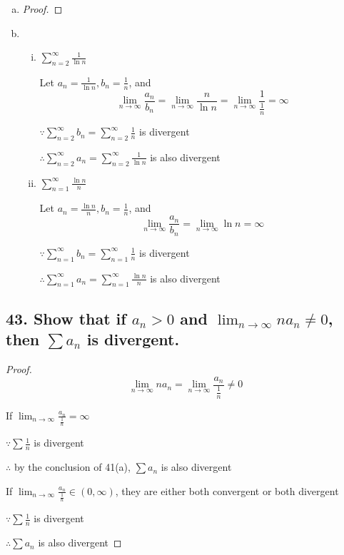 \documentclass{article}
\begin{document}
    \begin{enumerate}[(a)]
        \item \begin{proof}
            
        \end{proof}

        \item
        \begin{enumerate}[(i)]
            \item $\sum_{n=2}^\infty \frac{1}{\ln n}$

            Let $a_n = \frac{1}{\ln n}, b_n = \frac{1}{n}$, and $$\lim_{n\to\infty}\frac{a_n}{b_n} = \lim_{n\to\infty}\frac{n}{\ln n} = \lim_{n\to\infty}\frac{1}{\frac 1 n } = \infty$$

            $\because \sum_{n=2}^\infty b_n = \sum_{n=2}^\infty \frac 1 n$ is divergent

            $\therefore \sum_{n=2}^\infty a_n = \sum_{n=2}^\infty \frac{1}{\ln n}$ is also divergent

            \item $\sum_{n=1}^\infty \frac{\ln n}{n}$


            Let $a_n = \frac{\ln n}{n}, b_n = \frac{1}{n}$, and $$\lim_{n\to\infty}\frac{a_n}{b_n} = \lim_{n\to\infty}\ln n = \infty$$

            $\because \sum_{n=1}^\infty b_n = \sum_{n=1}^\infty \frac 1 n$ is divergent

            $\therefore \sum_{n=1}^\infty a_n = \sum_{n=1}^\infty \frac{\ln n}{n}$ is also divergent
        \end{enumerate}

    \end{enumerate}
    
    \subsection*{43. Show that if $a_n > 0$ and $\lim_{n\to\infty} na_n \not = 0$, then $\sum a_n$ is divergent.} 

    \begin{proof}
        $$\lim_{n\to\infty} na_n = \lim_{n\to\infty} \frac{a_n}{\frac 1 n} \not = 0$$

        If $\lim_{n\to\infty}\frac{a_n}{\frac 1 n} = \infty$
        
        $\because \sum \frac 1 n$ is divergent

        $\therefore$ by the conclusion of 41(a), $\sum a_n$ is also divergent

        If $\lim_{n\to\infty} \frac{a_n}{\frac 1 n} \in (0, \infty)$, they are either both convergent or both divergent

        $\because \sum \frac 1 n$ is divergent

        $\therefore \sum a_n$ is also divergent

    \end{proof}
\end{document}
